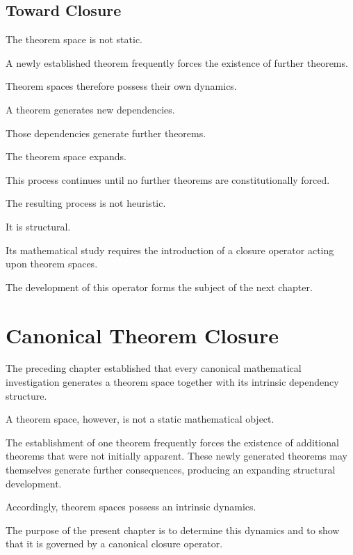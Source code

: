 \documentclass[13pt,openany]{book}
\theoremstyle{plain}
\theoremstyle{definition}
\begin{document}
\section{Toward Closure}

The theorem space is not static.

A newly established theorem frequently forces the existence of further
theorems.

Theorem spaces therefore possess their own dynamics.

A theorem generates new dependencies.

Those dependencies generate further theorems.

The theorem space expands.

This process continues until no further theorems are constitutionally forced.

The resulting process is not heuristic.

It is structural.

Its mathematical study requires the introduction of a closure operator acting
upon theorem spaces.

The development of this operator forms the subject of the next chapter.

\chapter{Canonical Theorem Closure}

The preceding chapter established that every canonical mathematical
investigation generates a theorem space together with its intrinsic dependency
structure.

A theorem space, however, is not a static mathematical object.

The establishment of one theorem frequently forces the existence of additional
theorems that were not initially apparent. These newly generated theorems may
themselves generate further consequences, producing an expanding structural
development.

Accordingly, theorem spaces possess an intrinsic dynamics.

The purpose of the present chapter is to determine this dynamics and to show
that it is governed by a canonical closure operator.
\end{document}
